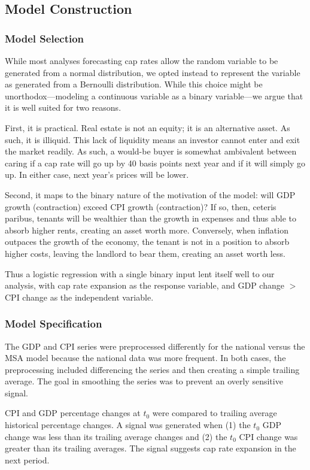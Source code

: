 \documentclass[jrfm,article,accept,oneauthor,pdftex]{Definitions/mdpi}
\begin{document}
\subsection{Model Construction}

\subsubsection{Model Selection}
While most analyses forecasting cap rates allow the random variable to be generated from a normal distribution, we opted instead to represent the variable as generated from a Bernoulli distribution. While this choice might be unorthodox---modeling a continuous variable as a binary variable---we argue that it is well suited for two reasons. 

First, it is practical. Real estate is not an equity; it is an alternative asset. As such, it is illiquid. This lack of liquidity means an investor cannot enter and exit the market readily. As such, a would-be buyer is somewhat ambivalent between caring if a cap rate will go up by 40 basis points next year and if it  will simply go up. In either case, next year's prices will be lower. 

Second, it maps to the binary nature of the motivation of the model: will GDP growth (contraction) exceed CPI growth (contraction)? If so, then, ceteris paribus, tenants will be wealthier than the growth in expenses and thus able to absorb higher rents, creating an asset worth more. Conversely, when inflation outpaces the growth of the economy, the tenant is not in a position to absorb higher costs, leaving the landlord to bear them, creating an asset worth less. 

Thus a logistic regression with a single binary input lent itself well to our analysis, with cap rate expansion as the response variable, and GDP change $ > $  CPI change as the independent variable. 

\subsubsection{Model Specification}

The GDP and CPI series were preprocessed differently for the national versus the MSA model because the national data was more frequent. In both cases, the preprocessing included differencing the series and then creating a simple trailing average. The goal in smoothing the series was to prevent an overly sensitive signal. 

CPI and GDP percentage changes at $t_0$ were compared to trailing average historical percentage changes. A  signal was generated when (1) the $t_0$ GDP change was less than its trailing average changes and (2) the $t_0$ CPI change was greater than its trailing averages. The signal suggests cap rate expansion in the next period. 
\end{document}
